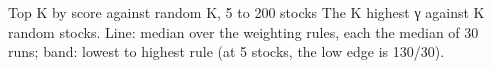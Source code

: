 {\renewcommand{\vnfootleft}{Real-data backtest, Jan 2025 – Sep 2026, hedge off. Stone–Geary is left out at 100 and 200
  stocks.}
\begin{frame}{Top K by score against random K, 5 to 200 stocks}
  \begingroup\small The K highest γ against K random stocks. Line: median over the weighting rules, each the median
  of 30 runs; band: lowest to highest rule (at 5 stocks, the low edge is 130/30).\par\endgroup
  \vspace{8pt}
  \centering
  \vnlargek{10.4cm}{4.2cm}\par
\end{frame}
}
